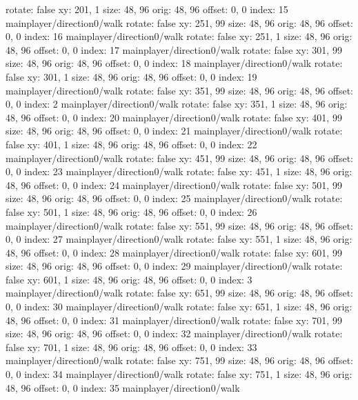   rotate: false
  xy: 201, 1
  size: 48, 96
  orig: 48, 96
  offset: 0, 0
  index: 15
mainplayer/direction0/walk
  rotate: false
  xy: 251, 99
  size: 48, 96
  orig: 48, 96
  offset: 0, 0
  index: 16
mainplayer/direction0/walk
  rotate: false
  xy: 251, 1
  size: 48, 96
  orig: 48, 96
  offset: 0, 0
  index: 17
mainplayer/direction0/walk
  rotate: false
  xy: 301, 99
  size: 48, 96
  orig: 48, 96
  offset: 0, 0
  index: 18
mainplayer/direction0/walk
  rotate: false
  xy: 301, 1
  size: 48, 96
  orig: 48, 96
  offset: 0, 0
  index: 19
mainplayer/direction0/walk
  rotate: false
  xy: 351, 99
  size: 48, 96
  orig: 48, 96
  offset: 0, 0
  index: 2
mainplayer/direction0/walk
  rotate: false
  xy: 351, 1
  size: 48, 96
  orig: 48, 96
  offset: 0, 0
  index: 20
mainplayer/direction0/walk
  rotate: false
  xy: 401, 99
  size: 48, 96
  orig: 48, 96
  offset: 0, 0
  index: 21
mainplayer/direction0/walk
  rotate: false
  xy: 401, 1
  size: 48, 96
  orig: 48, 96
  offset: 0, 0
  index: 22
mainplayer/direction0/walk
  rotate: false
  xy: 451, 99
  size: 48, 96
  orig: 48, 96
  offset: 0, 0
  index: 23
mainplayer/direction0/walk
  rotate: false
  xy: 451, 1
  size: 48, 96
  orig: 48, 96
  offset: 0, 0
  index: 24
mainplayer/direction0/walk
  rotate: false
  xy: 501, 99
  size: 48, 96
  orig: 48, 96
  offset: 0, 0
  index: 25
mainplayer/direction0/walk
  rotate: false
  xy: 501, 1
  size: 48, 96
  orig: 48, 96
  offset: 0, 0
  index: 26
mainplayer/direction0/walk
  rotate: false
  xy: 551, 99
  size: 48, 96
  orig: 48, 96
  offset: 0, 0
  index: 27
mainplayer/direction0/walk
  rotate: false
  xy: 551, 1
  size: 48, 96
  orig: 48, 96
  offset: 0, 0
  index: 28
mainplayer/direction0/walk
  rotate: false
  xy: 601, 99
  size: 48, 96
  orig: 48, 96
  offset: 0, 0
  index: 29
mainplayer/direction0/walk
  rotate: false
  xy: 601, 1
  size: 48, 96
  orig: 48, 96
  offset: 0, 0
  index: 3
mainplayer/direction0/walk
  rotate: false
  xy: 651, 99
  size: 48, 96
  orig: 48, 96
  offset: 0, 0
  index: 30
mainplayer/direction0/walk
  rotate: false
  xy: 651, 1
  size: 48, 96
  orig: 48, 96
  offset: 0, 0
  index: 31
mainplayer/direction0/walk
  rotate: false
  xy: 701, 99
  size: 48, 96
  orig: 48, 96
  offset: 0, 0
  index: 32
mainplayer/direction0/walk
  rotate: false
  xy: 701, 1
  size: 48, 96
  orig: 48, 96
  offset: 0, 0
  index: 33
mainplayer/direction0/walk
  rotate: false
  xy: 751, 99
  size: 48, 96
  orig: 48, 96
  offset: 0, 0
  index: 34
mainplayer/direction0/walk
  rotate: false
  xy: 751, 1
  size: 48, 96
  orig: 48, 96
  offset: 0, 0
  index: 35
mainplayer/direction0/walk
